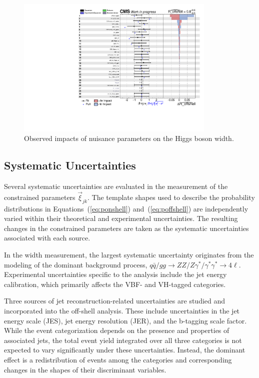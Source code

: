 \begin{figure}[!hbt]
\begin{center}
\includegraphics[width=0.85\textwidth]{figures/impacts_all.pdf}
\caption
{
Observed impacts of nuisance parameters on the Higgs boson width.
\label{fig:impact}
}
\end{center}
\end{figure}
\clearpage
\subsection{Systematic Uncertainties}

Several systematic uncertainties are evaluated in the measurement of the constrained parameters $\vec{\xi}_{jk}$. The template shapes used to describe the probability distributions in Equations~(\ref{eq:ponshell}) and~(\ref{eq:poffshell}) are independently varied within their theoretical and experimental uncertainties. The resulting changes in the constrained parameters are taken as the systematic uncertainties associated with each source.

In the \offshell width measurement, the largest systematic uncertainty originates from the modeling of the dominant background process, $q\bar{q}/gg \to ZZ/Z\gamma^*/\gamma^*\gamma^* \to 4\ell$. Experimental uncertainties specific to the \offshell analysis include the jet energy calibration, which primarily affects the VBF- and VH-tagged categories.

Three sources of jet reconstruction-related uncertainties are studied and incorporated into the off-shell analysis. These include uncertainties in the jet energy scale (JES), jet energy resolution (JER), and the b-tagging scale factor. While the event categorization depends on the presence and properties of associated jets, the total event yield integrated over all three categories is not expected to vary significantly under these uncertainties. Instead, the dominant effect is a redistribution of events among the categories and corresponding changes in the shapes of their discriminant variables.

